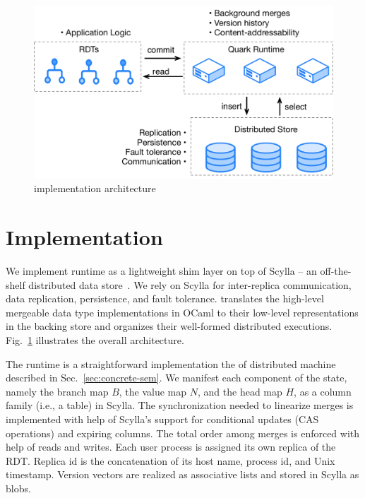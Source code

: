 \begin{figure}[ht]
  \centering
    \includegraphics[scale=0.35]{Figures/implementation2}
\caption{\quark implementation architecture}
\label{fig:implementation}
\end{figure}

\section{Implementation}
\label{sec:implementation}

We implement \quark runtime as a lightweight shim layer on top of
Scylla -- an off-the-shelf distributed data store~\cite{scylla}. We
rely on Scylla for inter-replica communication, data replication,
persistence, and fault tolerance. \quark translates the high-level
mergeable data type implementations in OCaml to their low-level
representations in the backing store and organizes their well-formed
distributed executions. Fig.~\ref{fig:implementation} illustrates the
overall architecture.

The runtime \quark is a straightforward implementation the of
distributed machine \quark described in Sec.~\ref{sec:concrete-sem}.
We manifest each component of the state, namely the branch map $B$,
the value map $N$, and the head map $H$, as a column family (i.e., a
table) in Scylla. The synchronization needed to linearize merges is
implemented with help of Scylla's support for conditional updates (CAS
operations) and expiring columns. The total order among merges is
enforced with help of  reads and writes. Each user process
is assigned its own replica of the RDT.  Replica id is the
concatenation of its host name, process id, and Unix timestamp.
Version vectors are realized as associative lists and stored in Scylla
as blobs.

